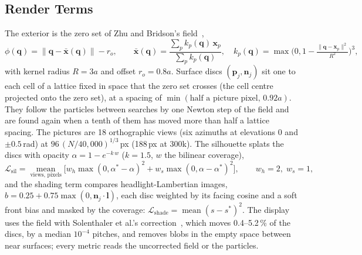 \subsection{Render Terms}
\label{app:ch4_render}
The exterior is the zero set of Zhu and Bridson's field~\citep{zhu2005sand},
\begin{equation}
\phi(\mathbf{q})=\lVert\mathbf{q}-\bar{\mathbf{x}}(\mathbf{q})\rVert-r_o,\qquad
\bar{\mathbf{x}}(\mathbf{q})=\frac{\sum_p k_p(\mathbf{q})\,\mathbf{x}_p}{\sum_p k_p(\mathbf{q})},\quad
k_p(\mathbf{q})=\max\!\Big(0,1-\tfrac{\lVert\mathbf{q}-\mathbf{x}_p\rVert^2}{R^2}\Big)^{3},
\end{equation}
with kernel radius $R=3a$ and offset $r_o=0.8a$. Surface discs $(\mathbf{p}_j,\mathbf{n}_j)$ sit one to each cell of a
lattice fixed in space that the zero set crosses (the cell centre projected onto the zero set), at a spacing of
$\min(\text{half a picture pixel},\,0.92a)$. They follow the particles between searches by one Newton step of the field and
are found again when a tenth of them has moved more than half a lattice spacing. The pictures are 18 orthographic views
(six azimuths at elevations $0$ and $\pm0.5$\,rad) at $96\,(N/40{,}000)^{1/3}$\,px (188\,px at 300k). The silhouette
splats the discs with opacity $\alpha=1-e^{-k\,w}$ ($k=1.5$, $w$ the bilinear coverage),
\begin{equation}
\mathcal{L}_{\mathrm{sil}}=\operatorname*{mean}_{\text{views, pixels}}\Big[w_h\max(0,\alpha^\ast-\alpha)^2
 +w_s\max(0,\alpha-\alpha^\ast)^2\Big],\qquad w_h=2,\;w_s=1 ,
\end{equation}
and the shading term compares headlight-Lambertian images, $b=0.25+0.75\max(0,\mathbf{n}_j\cdot\mathbf{l})$, each disc
weighted by its facing cosine and a soft front bias and masked by the coverage:
$\mathcal{L}_{\mathrm{shade}}=\operatorname{mean}(s-s^\ast)^2$. The display uses the field with Solenthaler et al.'s
correction~\citep{solenthaler2007unified}, which moves 0.4--5.2\,\% of the discs, by a median $10^{-4}$ pitches, and removes
blobs in the empty space between near surfaces; every metric reads the uncorrected field or the particles.


